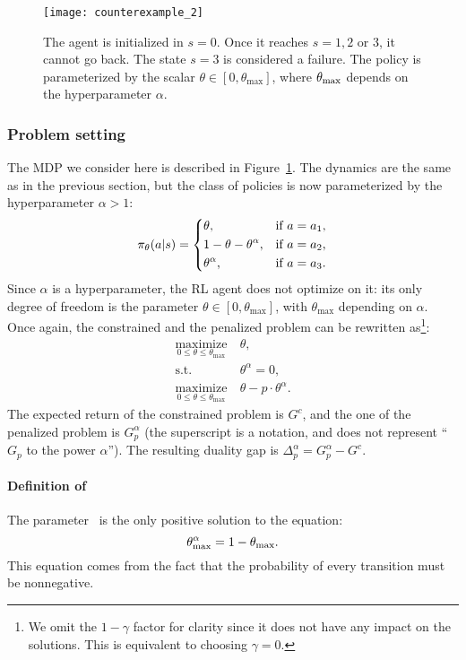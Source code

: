 \begin{figure}
	\centering
	\texttt{[image: counterexample\_2]}
	\caption{ The agent is initialized in $s=0$. Once it reaches $s=1, 2$ or $3$, it cannot go back. The state $s=3$ is considered a failure. The policy is parameterized by the scalar $\theta\in[0, \theta_{\text{max}}]$, where $\theta_\text{max}$ depends on the hyperparameter $\alpha$.}
	\label{fig:counterexample 2}
\end{figure}

\subsubsection{Problem setting}
The MDP we consider here is described in Figure~\ref{fig:counterexample 2}. The dynamics are the same as in the previous section, but the class of policies is now parameterized by the hyperparameter $\alpha > 1$:
$$
\pi_\theta(a|s) = \begin{dcases}
\theta,&\text{if}~a=a_1,\\
1 - \theta - \theta^\alpha,&\text{if}~a=a_2,\\
\theta^\alpha,&\text{if}~a=a_3.\\
\end{dcases}
$$
Since $\alpha$ is a hyperparameter, the RL agent does not optimize on it: its only degree of freedom is the parameter $\theta\in[0,\theta_\text{max}]$, with $\theta_\text{max}$ depending on $\alpha$. Once again, the constrained and the penalized problem can be rewritten as\footnote{We omit the $1-\gamma$ factor for clarity since it does not have any impact on the solutions. This is equivalent to choosing $\gamma = 0$.}:
\begin{align*}
\underset{0\leq\theta\leq\theta_\text{max}}{\text{maximize}}&~\theta,\\
\text{s.t.} &~\theta^\alpha = 0,\\
\underset{0\leq\theta\leq\theta_\text{max}}{\text{maximize}}&~\theta - p\cdot\theta^\alpha.
\end{align*}
The expected return of the constrained problem is $G^c$, and the one of the penalized problem is $G_p^\alpha$ (the superscript is a notation, and does not represent \enquote{$G_p$ to the power $\alpha$}). The resulting duality gap is $\Delta_p^\alpha = G_p^\alpha - G^c$.

\paragraph{Definition of \thetamax} The parameter \thetamax~is the only positive solution to the equation:
\begin{equation}
	\theta_\text{max}^\alpha = 1 - \theta_\text{max}.\label{eq:theta max}
\end{equation}
This equation comes from the fact that the probability of every transition must be nonnegative.

